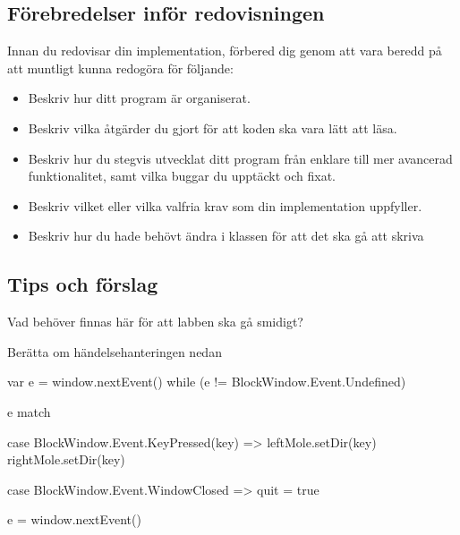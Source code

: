 \subsection{Förebredelser inför redovisningen}
Innan du redovisar din implementation, förbered dig genom att vara beredd på att muntligt kunna redogöra för följande:
\begin{itemize}[nosep, label={$\square$}]
  \item Beskriv hur ditt program är organiserat.
  \item Beskriv vilka åtgärder du gjort för att koden ska vara lätt att läsa.
  \item Beskriv hur du stegvis utvecklat ditt program från enklare till mer avancerad funktionalitet, samt vilka buggar du upptäckt och fixat.
  \item Beskriv vilket eller vilka valfria krav som din implementation uppfyller.
  \item Beskriv hur du hade behövt ändra i klassen  för att det ska gå att skriva 
\end{itemize}

\subsection{Tips och förslag}

\TODO Vad behöver finnas här för att labben ska gå smidigt?




\noindent\TODO Berätta om händelsehanteringen nedan
\begin{CodeSmall}
  var e = window.nextEvent()
  while (e != BlockWindow.Event.Undefined) {
    e match {
      case BlockWindow.Event.KeyPressed(key) =>
        leftMole.setDir(key)
        rightMole.setDir(key)

      case BlockWindow.Event.WindowClosed =>
        quit = true
    }
    e = window.nextEvent()
  }
\end{CodeSmall}

